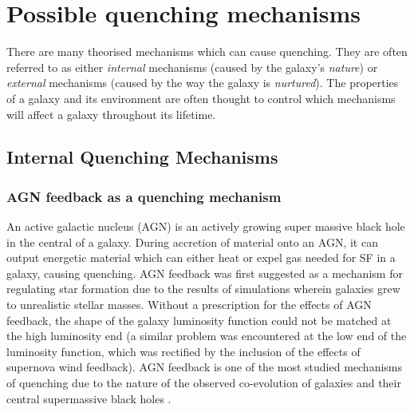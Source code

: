 \section{Possible quenching mechanisms}\label{sec:quenchmech}

There are many theorised mechanisms which can cause quenching. They are often referred to as either \emph{internal} mechanisms (caused by the galaxy's \emph{nature}) or \emph{external} mechanisms (caused by the way the galaxy is \emph{nurtured}). The properties of a galaxy and its environment are often thought to control which mechanisms will affect a galaxy throughout its lifetime. 

\subsection{Internal Quenching Mechanisms}\label{sec:intquench}

\subsubsection{AGN feedback as a quenching mechanism}\label{sec:agnquench}

An active galactic nucleus (AGN) is an actively growing super massive black hole in the central of a galaxy. During accretion of material onto an AGN, it can output energetic material which can either heat or expel gas needed for SF in a galaxy, causing quenching. AGN feedback was first suggested as a mechanism for regulating star formation due to the results of simulations \citep{silk98, Croton06, Bower06, somerville08} wherein galaxies grew to unrealistic stellar masses. Without a prescription for the effects of AGN feedback, the shape of the galaxy luminosity function \citep{} could not be matched at the high luminosity end (a similar problem was encountered at the low end of the luminosity function, which was rectified by the inclusion of the effects of supernova wind feedback). AGN feedback is one of the most studied mechanisms of quenching due to the nature of the observed co-evolution of galaxies and their central supermassive black holes \citep{magorrian98, marconi03, haringrix04}. 

